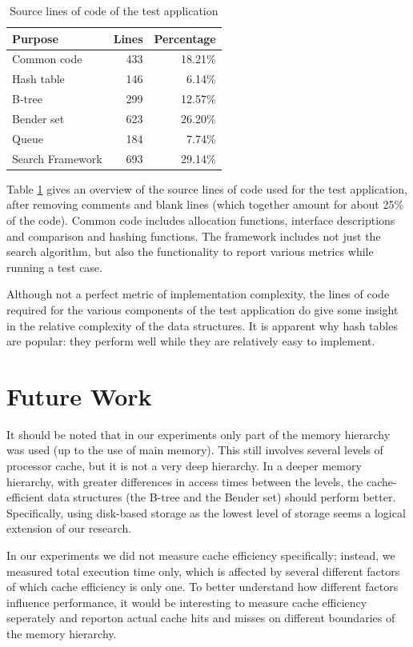 \documentclass{acm_proc_article-sp}
\begin{document}
\begin{table}
\begin{center}
\begin{tabular}{ l r r }
\hline
\textbf{Purpose} & \textbf{Lines} & \textbf{Percentage} \\
\hline
Common code       & 433 & 18.21\% \\
Hash table        & 146 &  6.14\% \\
B-tree            & 299 & 12.57\% \\
Bender set        & 623 & 26.20\% \\
Queue             & 184 &  7.74\% \\
Search Framework  & 693 & 29.14\% \\
\hline
\end{tabular}
\caption{Source lines of code of the test application}
\label{tab-loc}
\end{center}
\end{table}

Table \ref {tab-loc} gives an overview of the source lines of code used for
the test application, after removing comments and blank lines (which together
amount for about 25\% of the code). Common code includes allocation functions,
interface descriptions and comparison and hashing functions. The framework
includes not just the search algorithm, but also the functionality to report
various metrics while running a test case.

Although not a perfect metric of implementation complexity, the lines of code
required for the various components of the test application do give some
insight in the relative complexity of the data structures. It is apparent why
hash tables are popular: they perform well while they are relatively easy to
implement.

\section{Future Work}
It should be noted that in our experiments only part of the memory
hierarchy was used (up to the use of main memory). This still involves several
levels of processor cache, but it is not a very deep hierarchy. In a deeper
memory hierarchy, with greater differences in access times between the levels,
the cache-efficient data structures (the B-tree and the Bender set) should
perform better. Specifically, using disk-based storage as the lowest level of
storage seems a logical extension of our research.

In our experiments we did not measure cache efficiency specifically; instead,
we measured total execution time only, which is affected by several different
factors of which cache efficiency is only one.
To better understand how different factors influence performance, it would
be interesting to measure cache efficiency seperately and reporton actual
cache hits and misses on different boundaries of the memory hierarchy.
\end{document}
